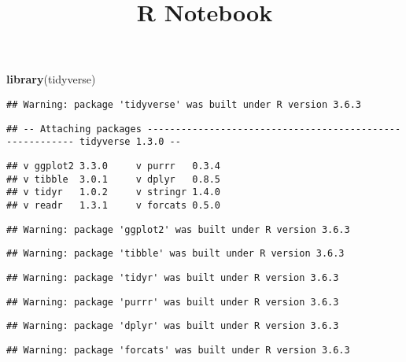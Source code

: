 \documentclass[
]{article}
\title{R Notebook}
\author{}
\date{\vspace{-2.5em}}
\newenvironment{Shaded}{\begin{snugshade}}{\end{snugshade}}
\newcommand{\KeywordTok}[1]{\textcolor[rgb]{0.13,0.29,0.53}{\textbf{#1}}}
\newcommand{\NormalTok}[1]{#1}
\begin{document}
\maketitle

{
\setcounter{tocdepth}{2}
\tableofcontents
}
\begin{Shaded}
\begin{Highlighting}[]
\KeywordTok{library}\NormalTok{(tidyverse)}
\end{Highlighting}
\end{Shaded}

\begin{verbatim}
## Warning: package 'tidyverse' was built under R version 3.6.3
\end{verbatim}

\begin{verbatim}
## -- Attaching packages --------------------------------------------------------- tidyverse 1.3.0 --
\end{verbatim}

\begin{verbatim}
## v ggplot2 3.3.0     v purrr   0.3.4
## v tibble  3.0.1     v dplyr   0.8.5
## v tidyr   1.0.2     v stringr 1.4.0
## v readr   1.3.1     v forcats 0.5.0
\end{verbatim}

\begin{verbatim}
## Warning: package 'ggplot2' was built under R version 3.6.3
\end{verbatim}

\begin{verbatim}
## Warning: package 'tibble' was built under R version 3.6.3
\end{verbatim}

\begin{verbatim}
## Warning: package 'tidyr' was built under R version 3.6.3
\end{verbatim}

\begin{verbatim}
## Warning: package 'purrr' was built under R version 3.6.3
\end{verbatim}

\begin{verbatim}
## Warning: package 'dplyr' was built under R version 3.6.3
\end{verbatim}

\begin{verbatim}
## Warning: package 'forcats' was built under R version 3.6.3
\end{verbatim}
\end{document}
